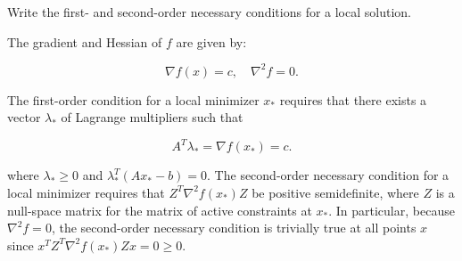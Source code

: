 Write the first- and second-order necessary conditions for a local solution.

\begin{solution}
    The gradient and Hessian of $f$ are given by:

    $$
    \nabla f(x) = c, \quad \nabla^2 f = 0.
    $$

    The first-order condition for a local minimizer $x_*$ requires that there exists a vector $\lambda_*$ of Lagrange 
    multipliers such that 

    $$
    A^T \lambda_* = \nabla f(x_*) = c.
    $$
    
    where $\lambda_* \ge 0$ and $\lambda_*^T (A x_* - b) = 0$. The second-order necessary condition for a local 
    minimizer requires that $Z^T \nabla^2 f(x_*) Z$ be positive semidefinite, where $Z$ is a null-space matrix for the 
    matrix of active constraints at $x_*$. In particular, because $\nabla^2 f = 0$, the second-order necessary condition
    is trivially true at all points $x$ since $x^T Z^T \nabla^2 f(x_*) Z x = 0 \ge 0$.
    \ \\
\end{solution}